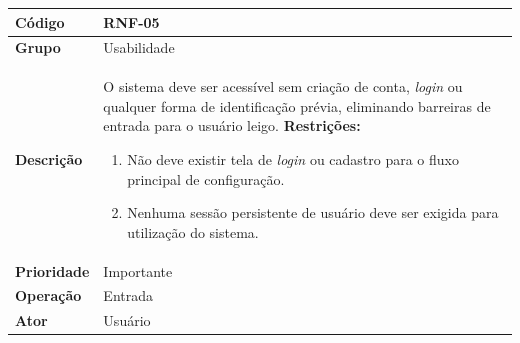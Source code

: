 \FloatBarrier
\begin{quadro}[htb]
  \caption{RNF-05 -- Acesso sem cadastro ou autenticação}
  \label{quad:rnf05}
  \begin{tabular}{|p{3.2cm}|p{11.8cm}|}
    \hline
    \textbf{Código}     & RNF-05                                                                       \\ \hline
    \textbf{Grupo}      & Usabilidade                                                                  \\ \hline
    \textbf{Descrição}  &
    O sistema deve ser acessível sem criação de conta, \textit{login} ou qualquer forma de identificação prévia, eliminando barreiras de entrada para o usuário leigo.
    \textbf{Restrições:}
    \begin{enumerate}[nosep,leftmargin=1.2em,topsep=2pt,partopsep=0pt,parsep=0pt,itemsep=1pt]
      \item Não deve existir tela de \textit{login} ou cadastro para o fluxo principal de configuração.
      \item Nenhuma sessão persistente de usuário deve ser exigida para utilização do sistema.
    \end{enumerate} \\ \hline
    \textbf{Prioridade} & Importante                                                                   \\ \hline
    \textbf{Operação}   & Entrada                                                                      \\ \hline
    \textbf{Ator}       & Usuário                                                                      \\ \hline
  \end{tabular}
\end{quadro}


